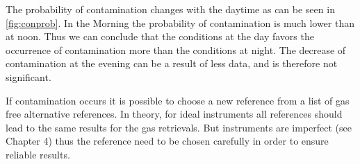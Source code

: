 The probability of contamination changes with the daytime as can be seen in \cref{fig:conprob}. In the Morning the probability of contamination is much lower than at noon. Thus we can conclude that the conditions at the day favors the occurrence of contamination more than the conditions at night. The decrease of contamination at the evening can be a result of less data, and is therefore not significant.

If contamination occurs it is possible to choose a new reference from a list of gas free alternative references. In theory, for ideal instruments all references should lead to
	the same results for the gas retrievals. But instruments are imperfect (see Chapter
	4) thus the reference need to be chosen carefully in order to ensure reliable results.\\
%
\\

